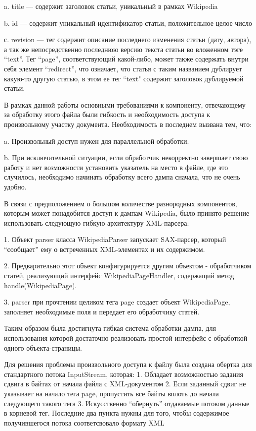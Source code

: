 a. title --- содержит заголовок статьи, уникальный в рамках Wikipedia

b. id --- содержит уникальный идентификатор статьи, положительное целое число

с. revision --- тег содержит описание последнего изменения статьи (дату, автора), 
а так же непосредственно последнюю версию текста статьи во вложенном тэге ``text''. 
Тег ``page'', соответствующий какой-либо, может также содержать внутри себя %
элемент “redirect”, что означает, что статья с таким названием дублирует 
какую-то другую статью, в этом ее тег ``text" содержит заголовок дублируемой статьи. 

В рамках данной работы основными требованиями к компоненту, отвечающему 
за обработку этого файла были гибкость и необходимость доступа к произвольному участку документа.
Необходимость в последнем вызвана тем, что:

a. Произвольный доступ нужен для параллельной обработки.

b. При исключительной ситуации, если обработчик некорректно завершает свою работу и 
нет возможности установить указатель на место в файле, где это случилось,
необходимо начинать обработку всего дампа сначала, что не очень удобно.

В связи с предположением о большом количестве разнородных компонентов,
которым может понадобится доступ к дампам Wikipedia, было принято решение 
использовать следующую гибкую архитектуру XML-парсера:

1. Объект parser класса WikipediaParser запускает SAX-парсер, который “сообщает” 
ему о встреченных XML-элементах и их содержимом.

2. Предварительно этот объект конфигурируется другим объектом - обработчиком статей,
 реализующий интерфейс WikipediaPageHandler, содержащий метод handle(WikipediaPage).

3. parser при прочтении целиком тега page создает объект WikipediaPage, заполняет 
необходимые поля и передает его обработчику статей.


Таким образом была достигнута гибкая система обработки дампа, для использования которой 
достаточно реализовать простой интерфейс с обработкой одного объекта-страницы.

Для решения проблемы произвольного доступа к файлу была создана обертка для стандартного потока InputStream, которая:
1. Обладает возможностью задания сдвига в байтах от начала файла с XML-документом
2. Если заданный сдвиг не указывает на начало тега page, пропустить все байты вплоть 
до начала следующего такого тега
3. Искусственно “обернуть” отдаваемые потоком данные в корневой тег.
Последние два пункта нужны для того, чтобы содержимое получившегося потока соответсвовало формату XML

